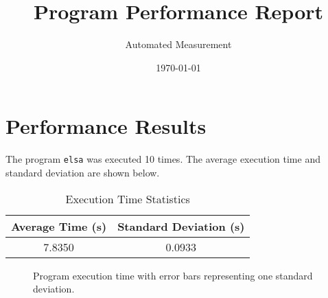 \documentclass{article}
\title{Program Performance Report}
\author{Automated Measurement}
\date{\today}
\begin{document}
\maketitle

\section{Performance Results}

The program \texttt{elsa} was executed 10 times. The average execution time and standard deviation are shown below.

\begin{table}[h]
\centering
\begin{tabular}{cc}
\toprule
Average Time (s) & Standard Deviation (s) \\
\midrule
7.8350 & 0.0933 \\
\bottomrule
\end{tabular}
\caption{Execution Time Statistics}
\end{table}

\begin{figure}[h]
\centering

\caption{Program execution time with error bars representing one standard deviation.}
\end{figure}
\end{document}
